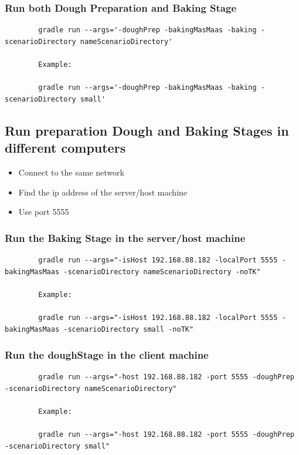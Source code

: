 \documentclass[paper=a4, fontsize=11pt]{scrartcl}
\begin{document}
	\subsubsection*{Run both Dough Preparation and Baking Stage}

	\begin{lstlisting}
		gradle run --args='-doughPrep -bakingMasMaas -baking -scenarioDirectory nameScenarioDirectory'

		Example:

		gradle run --args='-doughPrep -bakingMasMaas -baking -scenarioDirectory small'
	\end{lstlisting}

	\subsection{Run preparation Dough and Baking Stages in different computers}

	\begin{itemize}
		\item Connect to the same network
		\item Find the ip address of the server/host machine
		\item Use port 5555
	\end{itemize}

	\subsubsection*{Run the Baking Stage in the server/host machine}

	\begin{lstlisting}
		gradle run --args="-isHost 192.168.88.182 -localPort 5555 -bakingMasMaas -scenarioDirectory nameScenarioDirectory -noTK"

		Example:

		gradle run --args="-isHost 192.168.88.182 -localPort 5555 -bakingMasMaas -scenarioDirectory small -noTK"

	\end{lstlisting}



	\subsubsection*{Run the doughStage in the client machine}

	\begin{lstlisting}
		gradle run --args="-host 192.168.88.182 -port 5555 -doughPrep -scenarioDirectory nameScenarioDirectory"

		Example:

		gradle run --args="-host 192.168.88.182 -port 5555 -doughPrep -scenarioDirectory small"


	\end{lstlisting}
\end{document}
